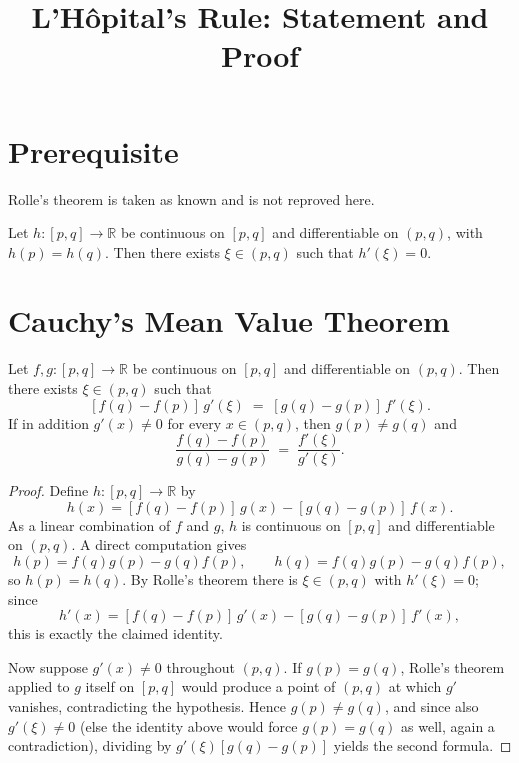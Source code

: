 \documentclass{essay}
\title{L'H\^opital's Rule: Statement and Proof}
\author{}
\date{}
\begin{document}
\maketitle

\section{Prerequisite}

Rolle's theorem is taken as known and is not reproved here.

\begin{theorem}[Rolle]
  Let $h:[p,q]\to\mathbb{R}$ be continuous on $[p,q]$ and differentiable on $(p,q)$, with $h(p)=h(q)$. Then there exists $\xi\in(p,q)$ such that $h'(\xi)=0$.
\end{theorem}

\section{Cauchy's Mean Value Theorem}

\begin{lemma}[Cauchy]
  Let $f,g:[p,q]\to\mathbb{R}$ be continuous on $[p,q]$ and differentiable on $(p,q)$. Then there exists $\xi\in(p,q)$ such that
  \[
    [f(q)-f(p)]\,g'(\xi) \;=\; [g(q)-g(p)]\,f'(\xi).
  \]
  If in addition $g'(x)\neq 0$ for every $x\in(p,q)$, then $g(p)\neq g(q)$ and
  \[
    \frac{f(q)-f(p)}{g(q)-g(p)} \;=\; \frac{f'(\xi)}{g'(\xi)}.
  \]
\end{lemma}

\begin{proof}
  Define $h:[p,q]\to\mathbb{R}$ by
  \[
    h(x) = [f(q)-f(p)]\,g(x) - [g(q)-g(p)]\,f(x).
  \]
  As a linear combination of $f$ and $g$, $h$ is continuous on $[p,q]$ and differentiable on $(p,q)$. A direct computation gives
  \[
    h(p) = f(q)g(p) - g(q)f(p), \qquad h(q) = f(q)g(p) - g(q)f(p),
  \]
  so $h(p)=h(q)$. By Rolle's theorem there is $\xi\in(p,q)$ with $h'(\xi)=0$; since
  \[
    h'(x) = [f(q)-f(p)]\,g'(x) - [g(q)-g(p)]\,f'(x),
  \]
  this is exactly the claimed identity.

  Now suppose $g'(x)\neq 0$ throughout $(p,q)$. If $g(p)=g(q)$, Rolle's theorem applied to $g$ itself on $[p,q]$ would produce a point of $(p,q)$ at which $g'$ vanishes, contradicting the hypothesis. Hence $g(p)\neq g(q)$, and since also $g'(\xi)\neq 0$ (else the identity above would force $g(p)=g(q)$ as well, again a contradiction), dividing by $g'(\xi)[g(q)-g(p)]$ yields the second formula.
\end{proof}
\end{document}
